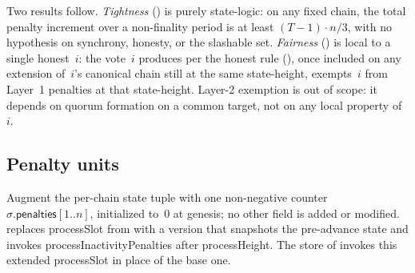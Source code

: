 \ifx\litemode\undefined\documentclass{article}\fi
\newcommand{\penalties}{\mathsf{penalties}}
\newcommand{\processSlot}{\textsf{processSlot}\xspace}
\newcommand{\processHeight}{\textsf{processHeight}\xspace}
\newcommand{\processInactivityPenalties}{\textsf{processInactivityPenalties}\xspace}
\theoremstyle{plain}
\theoremstyle{definition}
\theoremstyle{remark}
\begin{document}
Two results follow.
\emph{Tightness} () is purely state-logic: on any fixed chain, the total penalty increment over a non-finality period is at least $(T-1) \cdot n/3$, with no hypothesis on synchrony, honesty, or the slashable set.
\emph{Fairness} () is local to a single honest~$i$: the vote~$i$ produces per the honest rule (), once included on any extension of~$i$'s canonical chain still at the same state-height, exempts~$i$ from Layer~1 penalties at that state-height.
Layer-2 exemption is out of scope: it depends on quorum formation on a common target, not on any local property of~$i$.

\subsection{Penalty units}

Augment the per-chain state tuple with one non-negative counter $\sigma.\penalties[1..n]$, initialized to~$0$ at genesis; no other field is added or modified.
 replaces \processSlot from  with a version that snapshots the pre-advance state and invokes \processInactivityPenalties after \processHeight.
The store of  invokes this extended \processSlot in place of the base one.
\end{document}
